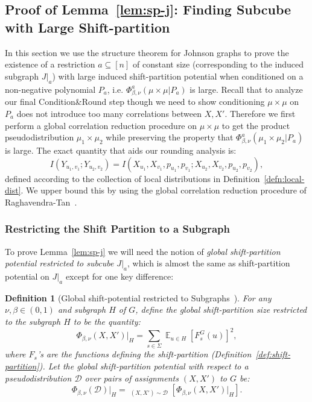 \documentclass[11pt]{article}
\DeclareMathOperator*{\E}{\mathbb{E}}
\DeclareMathOperator*{\pE}{\widetilde{\mathbb{E}}}
\def \cD {\mathcal{D}}
\newtheorem{definition}[theorem]{Definition}
\theoremstyle{definition}
\begin{document}
\subsection{Proof of Lemma~\ref{lem:sp-j}: Finding Subcube with Large Shift-partition}\label{sec:large-potential}

In this section we use the structure theorem for Johnson graphs
to prove the existence of a restriction $a \subseteq [n]$ of constant size (corresponding to the induced subgraph $J|_a$) with large induced shift-partition potential when conditioned on a non-negative polynomial $P_a$, i.e. $\Phi^a_{\beta,\nu}(\mu \times \mu | P_a)$ is large. Recall that to analyze our final Condition\&Round step though we need to show conditioning $\mu \times \mu$ on $P_a$ does not introduce too many correlations between $X, X'$. Therefore we first perform a global correlation reduction procedure on $\mu \times \mu$ to get the product pseudodistribution $\mu_1 \times \mu_2$ while preserving the property that $\Phi^a_{\beta,\nu}(\mu_1 \times \mu_2 | P_a)$ is large.
The exact quantity that aids our rounding analysis is: 
\[I(Y_{u_1,v_1};Y_{u_2,v_2}) =  I(X_{u_1},X_{v_1},p_{u_1},p_{v_1};X_{u_2},X_{v_2},p_{u_2},p_{v_2}),\] 
defined according to the collection of local distributions in Definition~\ref{defn:local-dist}. We upper bound this by using the global correlation reduction procedure of Raghavendra-Tan~\cite{RT12}. 

\subsubsection{Restricting the Shift Partition to a Subgraph}
To prove Lemma~\ref{lem:sp-j} we will need the notion of
\emph{global shift-partition potential restricted to subcube $J|_a$}, which is almost the same as shift-partition potential on $J|_a$ except for one key difference:
\begin{definition}[Global shift-potential restricted to Subgraphs~\cite{BBKSS}]\label{def:res-shift}
For any $\nu,\beta \in (0,1)$ and subgraph $H$ of $G$, define the {\em global shift-partition size restricted to the subgraph $H$} to be the quantity:
\[
\Phi_{\beta,\nu}(X,X')|_H = \sum_{s \in \Sigma} \E_{u \in H} [F_s^{G}(u)]^2,
\]
where $F_s$'s are the functions defining the shift-partition (Definition~\ref{def:shift-partition}). 
Let the global shift-partition potential with respect to a pseudodistribution $\cD$ over pairs of assignments $(X,X')$ to $G$ be:
\[
\Phi_{\beta,\nu}(\cD)|_H = \pE_{(X,X') \sim \cD}[\Phi_{\beta,\nu}(X,X')|_H].
\]
\end{definition}
\end{document}
